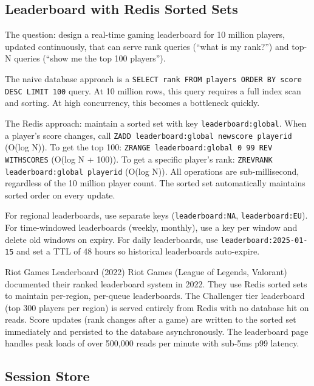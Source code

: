 \documentclass[11pt,a4paper]{article}
\begin{document}
\subsection{Leaderboard with Redis Sorted Sets}

The question: design a real-time gaming leaderboard for 10 million players, updated continuously, that can serve rank queries (``what is my rank?'') and top-N queries (``show me the top 100 players'').

The naive database approach is a \texttt{SELECT rank FROM players ORDER BY score DESC LIMIT 100} query. At 10 million rows, this query requires a full index scan and sorting. At high concurrency, this becomes a bottleneck quickly.

The Redis approach: maintain a sorted set with key \texttt{leaderboard:global}. When a player's score changes, call \texttt{ZADD leaderboard:global newscore playerid} (O(log N)). To get the top 100: \texttt{ZRANGE leaderboard:global 0 99 REV WITHSCORES} (O(log N + 100)). To get a specific player's rank: \texttt{ZREVRANK leaderboard:global playerid} (O(log N)). All operations are sub-millisecond, regardless of the 10 million player count. The sorted set automatically maintains sorted order on every update.

For regional leaderboards, use separate keys (\texttt{leaderboard:NA}, \texttt{leaderboard:EU}). For time-windowed leaderboards (weekly, monthly), use a key per window and delete old windows on expiry. For daily leaderboards, use \texttt{leaderboard:2025-01-15} and set a TTL of 48 hours so historical leaderboards auto-expire.

\begin{industrybox}{Riot Games Leaderboard (2022)}
Riot Games (League of Legends, Valorant) documented their ranked leaderboard system in 2022. They use Redis sorted sets to maintain per-region, per-queue leaderboards. The Challenger tier leaderboard (top 300 players per region) is served entirely from Redis with no database hit on reads. Score updates (rank changes after a game) are written to the sorted set immediately and persisted to the database asynchronously. The leaderboard page handles peak loads of over 500,000 reads per minute with sub-5ms p99 latency.
\end{industrybox}

\subsection{Session Store}
\end{document}
